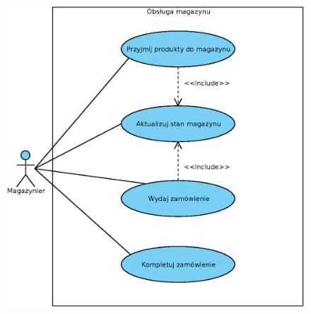 
\begin{figure}[H]
	\centering
	\includegraphics[width=.8\textwidth]{img/UC/magazyn.eps}
\end{figure}

